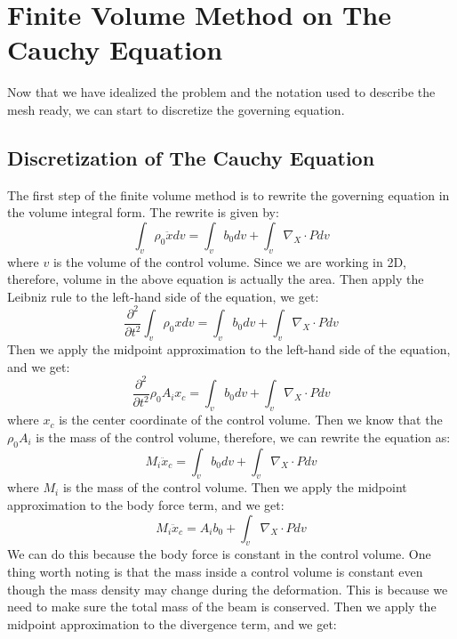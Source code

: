 \documentclass[acmtog]{acmart}
\begin{document}
\section{Finite Volume Method on The Cauchy Equation}
Now that we have idealized the problem and the notation used to describe the mesh ready, we can start to discretize the governing equation.
\subsection{Discretization of The Cauchy Equation}
The first step of the finite volume method is to rewrite the governing equation in the volume integral form. The rewrite is given by:
\begin{equation*}
    \int_{v} \rho_0 \ddot{x} dv = \int_{v} b_0 dv + \int_{v} \nabla_X \cdot P dv
\end{equation*}
where $v$ is the volume of the control volume. Since we are working in 2D, therefore, volume in the above equation is actually the area. Then apply the Leibniz rule to the left-hand side of the equation, we get:
\begin{equation*}
    \frac{\partial^2}{\partial t^2} \int_{v} \rho_0 x dv = \int_{v} b_0 dv + \int_{v} \nabla_X \cdot P dv
\end{equation*}
Then we apply the midpoint approximation to the left-hand side of the equation, and we get:
\begin{equation*}
    \frac{\partial^2}{\partial t^2} \rho_0 A_i x_c = \int_{v} b_0 dv + \int_{v} \nabla_X \cdot P dv
\end{equation*}
where $x_c$ is the center coordinate of the control volume. Then we know that the $\rho_0A_i$ is the mass of the control volume, therefore, we can rewrite the equation as:
\begin{equation*}
    M_i \ddot{x}_c = \int_{v} b_0 dv + \int_{v} \nabla_X \cdot P dv
\end{equation*}
where $M_i$ is the mass of the control volume. Then we apply the midpoint approximation to the body force term, and we get:
\begin{equation*}
    M_i \ddot{x}_c = A_i b_0 + \int_{v} \nabla_X \cdot P dv
\end{equation*}
We can do this because the body force is constant in the control volume. One thing worth noting is that the mass inside a control volume is constant even though the mass density may change during the deformation. This is because we need to make sure the total mass of the beam is conserved. Then we apply the midpoint approximation to the divergence term, and we get:
\end{document}
